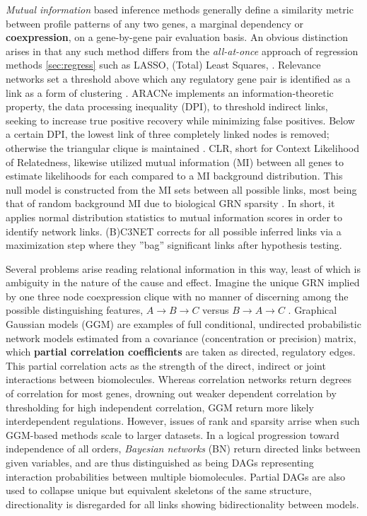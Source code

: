 \emph{Mutual information} based inference methods generally define a similarity metric between profile patterns of any two genes, a marginal dependency or \textbf{coexpression}, on a gene-by-gene pair evaluation basis. An obvious distinction arises in that any such method differs from the {\it all-at-once} approach of regression methods \cref{sec:regress} such as LASSO, (Total) Least Squares, \etc. Relevance networks set a threshold above which any regulatory gene pair is identified as a link as a form of clustering \citep{faith2007large}. ARACNe implements an information-theoretic property, the data processing inequality (DPI), to threshold indirect links, seeking to increase true positive recovery while minimizing false positives. Below a certain DPI, the lowest link of three completely linked nodes is removed; otherwise the triangular clique is maintained \citep{montes2014aracne}. CLR, short for Context Likelihood of Relatedness, likewise utilized mutual information (MI) between all genes to estimate likelihoods for each compared to a MI background distribution. This null model is constructed from the MI sets between all possible links, most being that of random background MI due to biological GRN sparsity \citep{faith2007large}. In short, it applies normal distribution statistics to mutual information scores in order to identify network links. (B)C3NET \citep{altay2010inferring,de2012bagging} corrects for all possible inferred links via a maximization step where they ''bag'' significant links after hypothesis testing.

Several problems arise reading relational information in this way, least of which is ambiguity in the nature of the cause and effect. Imagine the unique GRN implied by one three node coexpression clique with no manner of discerning among the possible distinguishing features, \eg $A\to B\to C$ versus $ B\to A\to C$ \citep{markowetz2007inferring}.
Graphical Gaussian models (GGM) are examples of full conditional, undirected probabilistic network models estimated from a covariance (\ie concentration or precision) matrix, which \textbf{partial correlation coefficients} are taken as directed, regulatory edges. This partial correlation acts as the strength of the direct, indirect or joint interactions between biomolecules. Whereas correlation networks return degrees of correlation for most genes, drowning out weaker dependent correlation by thresholding for high independent correlation, GGM return more likely interdependent regulations\citep{schafer2004empirical}. However, issues of rank and sparsity arrise when such GGM-based methods scale to larger datasets. In a logical progression toward independence of all orders, \emph{Bayesian networks} (BN) return directed links between given variables, and are thus distinguished as being DAGs representing interaction probabilities between multiple biomolecules. Partial DAGs are also used to collapse unique but equivalent skeletons of the same structure, \ie directionality is disregarded for all links showing bidirectionality between models.



